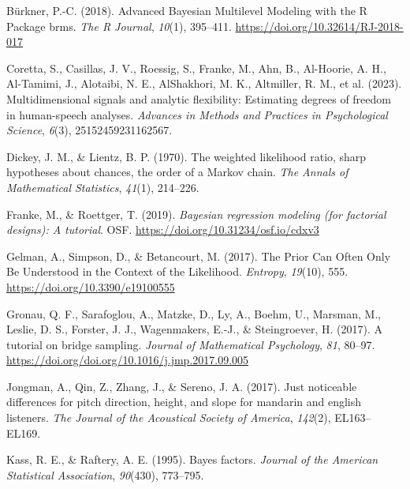 \documentclass[
  doc,
  floatsintext,
  longtable,
  nolmodern,
  notxfonts,
  notimes,
  colorlinks=true,linkcolor=blue,citecolor=blue,urlcolor=blue]{apa7}
\newlength{\cslhangindent}
\newenvironment{CSLReferences}[2] %
 {\begin{list}{}{%
  \setlength{\itemindent}{0pt}
  \setlength{\leftmargin}{0pt}
  \setlength{\parsep}{0pt}
  \ifodd #1
   \setlength{\leftmargin}{\cslhangindent}
   \setlength{\itemindent}{-1\cslhangindent}
  \fi
  \setlength{\itemsep}{#2\baselineskip}}}
 {\end{list}}
\begin{document}
\label{refs}
\begin{CSLReferences}{1}{0}
Bürkner, P.-C. (2018). {Advanced Bayesian Multilevel Modeling with the R
Package brms}. \emph{{The R Journal}}, \emph{10}(1), 395--411.
\url{https://doi.org/10.32614/RJ-2018-017}

Coretta, S., Casillas, J. V., Roessig, S., Franke, M., Ahn, B.,
Al-Hoorie, A. H., Al-Tamimi, J., Alotaibi, N. E., AlShakhori, M. K.,
Altmiller, R. M., et al. (2023). Multidimensional signals and analytic
flexibility: Estimating degrees of freedom in human-speech analyses.
\emph{Advances in Methods and Practices in Psychological Science},
\emph{6}(3), 25152459231162567.

Dickey, J. M., \& Lientz, B. P. (1970). The weighted likelihood ratio,
sharp hypotheses about chances, the order of a {M}arkov chain. \emph{The
Annals of Mathematical Statistics}, \emph{41}(1), 214--226.

Franke, M., \& Roettger, T. (2019). \emph{Bayesian regression modeling
(for factorial designs): {A} tutorial}. OSF.
\url{https://doi.org/10.31234/osf.io/cdxv3}

Gelman, A., Simpson, D., \& Betancourt, M. (2017). The {Prior Can Often
Only Be Understood} in the {Context} of the {Likelihood}.
\emph{Entropy}, \emph{19}(10), 555.
\url{https://doi.org/10.3390/e19100555}

Gronau, Q. F., Sarafoglou, A., Matzke, D., Ly, A., Boehm, U., Marsman,
M., Leslie, D. S., Forster, J. J., Wagenmakers, E.-J., \& Steingroever,
H. (2017). A tutorial on bridge sampling. \emph{Journal of Mathematical
Psychology}, \emph{81}, 80--97.
\url{https://doi.org/doi.org/10.1016/j.jmp.2017.09.005}

Jongman, A., Qin, Z., Zhang, J., \& Sereno, J. A. (2017). Just
noticeable differences for pitch direction, height, and slope for
mandarin and english listeners. \emph{The Journal of the Acoustical
Society of America}, \emph{142}(2), EL163--EL169.

Kass, R. E., \& Raftery, A. E. (1995). Bayes factors. \emph{Journal of
the American Statistical Association}, \emph{90}(430), 773--795.


\end{CSLReferences}
\end{document}
